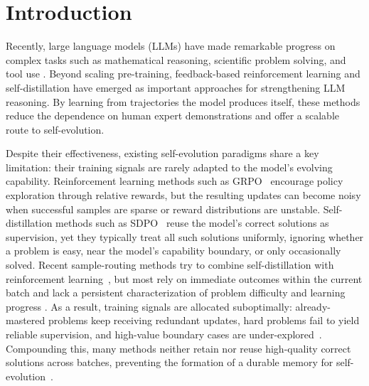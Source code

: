 \documentclass{article}
\begin{document}
\section{Introduction}

Recently, large language models (LLMs) have made remarkable progress on complex tasks such as mathematical reasoning, scientific problem solving, and tool use \cite{jaech2024learning,guo2025deepseekr1,deepseekai2026deepseekv4,comanici2025gemini25,olmo2025olmo3}. Beyond scaling pre-training, feedback-based reinforcement learning and self-distillation have emerged as important approaches for strengthening LLM reasoning\cite{shao2024deepseekmath,gu2023minillm,hubotter2026reinforcement,zhao2026opsd,jin2026entropyopd,fu2026revisitingopd,pan2026rlcsd,li2026rethinkingopd}. By learning from trajectories the model produces itself, these methods reduce the dependence on human expert demonstrations and offer a scalable route to self-evolution.

Despite their effectiveness, existing self-evolution paradigms share a key limitation: their training signals are rarely adapted to the model's evolving capability. Reinforcement learning methods such as GRPO~\citep{shao2024deepseekmath} encourage policy exploration through relative rewards, but the resulting updates can become noisy when successful samples are sparse or reward distributions are unstable. Self-distillation methods such as SDPO~\citep{hubotter2026reinforcement} reuse the model's correct solutions as supervision, yet they typically treat all such solutions uniformly, ignoring whether a problem is easy, near the model's capability boundary, or only occasionally solved. Recent sample-routing methods try to combine self-distillation with reinforcement learning~\citep{li2026srpo}, but most rely on immediate outcomes within the current batch and lack a persistent characterization of problem difficulty and learning progress \cite{zhang2025grpolead}. As a result, training signals are allocated suboptimally: already-mastered problems keep receiving redundant updates, hard problems fail to yield reliable supervision, and high-value boundary cases are under-explored~\cite{zhang2025grpolead,baroian2026prompt,hubotter2026reinforcement}. Compounding this, many methods neither retain nor reuse high-quality correct solutions across batches, preventing the formation of a durable memory for self-evolution~\citep{lin1992self,schaul2016prioritized,zhan2026exgrpo}.
\end{document}
